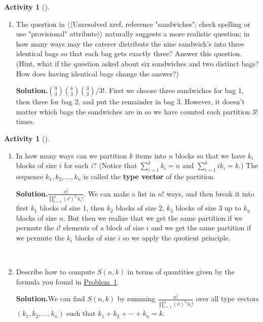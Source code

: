\documentclass[10pt,]{book}
\newcommand{\terminology}[1]{\textbf{#1}}
\theoremstyle{plain}
\theoremstyle{definition}
\newtheorem{activity}[project]{Activity}
\numberwithin{equation}{chapter}
\begin{document}
\begin{activity}[]
\begin{enumerate}[label=(\alph*)]
~\par
\item The question in {$\langle\langle$Unresolved xref, reference "sandwiches"; check spelling or use "provisional" attribute$\rangle\rangle$} naturally suggests a more realistic question; in how many ways may the caterer distribute the nine sandwich's into three identical bags so that each bag gets exactly three? Answer this question. (Hint, what if the question asked about six sandwiches and two distinct bags? How does having identical bags change the answer?)%
\par\medskip\noindent%
\textbf{Solution.}\quad \(\binom{9}{3}\binom{6}{3}\binom{3}{3}/3!\). First we choose three sandwiches for bag 1, then three for bag 2, and put the remainder in bag 3. However, it doesn't matter which bags the sandwiches are in so we have counted each partition \(3!\) times.%

\end{enumerate}
\end{activity}
\begin{activity}[]\label{partitionsgivenpartsize}
~\par
\begin{enumerate}[label=(\alph*)]
 \item In how many ways can we partition \(k\) items into \(n\) blocks so that we have \(k_i\) blocks of size \(i\) for each \(i\)? (Notice that \(\sum_{i=1}^k k_i = n\) and \(\sum_{i=1}^k ik_i = k\).) The sequence \(k_1,k_2,\ldots,k_n\) is called the \terminology{type vector} of the partition.%
\par\medskip\noindent%
\textbf{Solution.}\quad \(\frac{n!}{\prod_{i=1}^n (i!)^{k_i}{k_i!}}\). We can make a list in \(n!\) ways, and then break it into first \(k_1\) blocks of size 1, then \(k_2\) blocks of size 2, \(k_3\) blocks of size 3 up to \(k_n\) blocks of size \(n\). But then we realize that we get the same partition if we permute the \(i!\) elements of a block of size \(i\) and we get the same partition if we permute the \(k_i\) blocks of size \(i\) so we apply the quotient principle.%

~\par
\item Describe how to compute \(S(n,k)\) in terms of quantities given by the formula you found in \hyperref[partitionsgivenpartsize]{Problem~\ref{partitionsgivenpartsize}}.%
\par\medskip\noindent%
\textbf{Solution.}\quad We can find \(S(n,k)\) by summing \(\frac{n!}{\prod_{i=1}^n (i!)^{k_i}{k_i!}}\) over all type vectors \((k_1,k_2,\ldots,k_n)\) such that \(k_1+k_2+\cdots+k_n=k\).%

\end{enumerate}
\end{activity}
\end{document}

